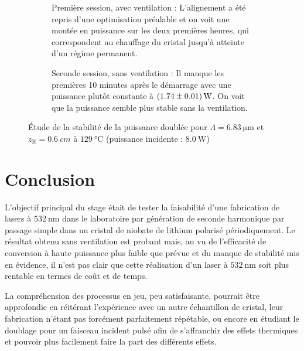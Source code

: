 \documentclass[11pt,a4paper]{article}
\newcommand{\lmbd}[1]{$\SI{#1}{\nano\metre}$}
\newcommand{\zr}{z_\mathsc{R}}
\newcommand{\mathsc}[1]{\mathrm{\scriptscriptstyle {#1}}}
\begin{document}
\begin{figure}[htpb]  
\centering
\begin{subfigure}[b]{\textwidth}
	\centering
	
	\caption{Première session, avec ventilation : \small L'alignement a été repris d'une optimisation préalable et on voit une montée en puissance sur les deux premières heures, qui correspondent au chauffage du cristal jusqu'à atteinte d'un régime permanent.}
	\label{fig:mesc1}
\end{subfigure}
\begin{subfigure}[b]{\textwidth}
	\centering
	
	\caption{Seconde session, sans ventilation : \small Il manque les premières 10 minutes après le démarrage avec une puissance plutôt constante à $\SI{1.74+-0.01}{\watt}$. On voit que la puissance semble plus stable sans la ventilation.}
	\label{fig:mesc2}
\end{subfigure}
\caption{Étude de la stabilité de la puissance doublée pour $\Lambda=\SI{6.83}{\micro\meter}$ et $\zr = \SI{0.6}{cm}$ à $\SI{129}{\celsius}$ (puissance incidente : $\SI{8.0}{\watt}$)}
\end{figure}


\section{Conclusion}
L'objectif principal du stage était de tester la faisabilité d'une fabrication de lasers à \lmbd{532} dans le laboratoire par génération de seconde harmonique par passage simple dans un cristal de niobate de lithium polarisé périodiquement. Le résultat obtenu sans ventilation est probant mais, au vu de l'efficacité de conversion à haute puissance plus faible que prévue et du manque de stabilité mis en évidence, il n'est pas clair que cette réalisation d'un laser à \lmbd{532} soit plus rentable en termes de coût et de temps.

La compréhension des processus en jeu, peu satisfaisante, pourrait être approfondie en réitérant l'expérience avec un autre échantillon de cristal, leur fabrication n'étant pas forcément parfaitement répétable, ou encore en étudiant le doublage pour un faisceau incident pulsé afin de s'affranchir des effets thermiques et pouvoir plus facilement faire la part des différents effets.

\end{document}
